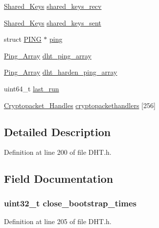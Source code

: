 \begin{DoxyCompactItemize}
\hyperlink{struct_shared___keys}{Shared\+\_\+\+Keys} \hyperlink{struct_d_h_t_a4c647e235c4b9d2d6d68d760c7cb1b30}{shared\+\_\+keys\+\_\+recv}
\item 
\hyperlink{struct_shared___keys}{Shared\+\_\+\+Keys} \hyperlink{struct_d_h_t_a07b2f51891b851ec0cd7dfe729412f77}{shared\+\_\+keys\+\_\+sent}
\item 
struct \hyperlink{struct_p_i_n_g}{P\+I\+N\+G} $\ast$ \hyperlink{struct_d_h_t_ae3f68e3d55e46726b05717fc88198321}{ping}
\item 
\hyperlink{struct_ping___array}{Ping\+\_\+\+Array} \hyperlink{struct_d_h_t_a8432234ba71a00ac9c516cb80a70f29d}{dht\+\_\+ping\+\_\+array}
\item 
\hyperlink{struct_ping___array}{Ping\+\_\+\+Array} \hyperlink{struct_d_h_t_a957126e184a8b8001228effc56b9db95}{dht\+\_\+harden\+\_\+ping\+\_\+array}
\item 
uint64\+\_\+t \hyperlink{struct_d_h_t_a73e8197b772061572cb931a378ade3e4}{last\+\_\+run}
\item 
\hyperlink{struct_cryptopacket___handles}{Cryptopacket\+\_\+\+Handles} \hyperlink{struct_d_h_t_a461ccd9a581712b103785034f31d0d82}{cryptopackethandlers} \mbox{[}256\mbox{]}
\end{DoxyCompactItemize}


\subsection{Detailed Description}


Definition at line 200 of file D\+H\+T.\+h.



\subsection{Field Documentation}
\hypertarget{struct_d_h_t_afacccecf0d2090a9dec8d06f3f119087}{
\subsubsection[{close\+\_\+bootstrap\+\_\+times}]{\setlength{\rightskip}{0pt plus 5cm}uint32\+\_\+t close\+\_\+bootstrap\+\_\+times}}\label{struct_d_h_t_afacccecf0d2090a9dec8d06f3f119087}


Definition at line 205 of file D\+H\+T.\+h.



